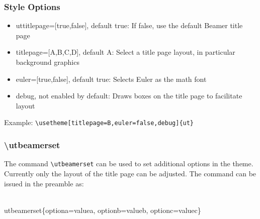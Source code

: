 \documentclass{beamer}
\begin{document}
\begin{frame}[fragile] \frametitle{Style Options}
\begin{itemize}
\item uttitlepage=[true,false], default true: If false, use the default Beamer title page
\item titlepage=[A,B,C,D], default A: Select a title page layout, in particular background graphics
\item euler=[true,false], default true: Selects Euler as the math font
\item debug, not enabled by default: Draws boxes on the title page to facilitate layout
\end{itemize}

Example: \verb!\usetheme[titlepage=B,euler=false,debug]{ut}!
\end{frame}


\begin{frame}[fragile] \frametitle{\textbackslash utbeamerset}
The command \verb!\utbeamerset! can be used to set additional options in the theme. Currently
only the layout of the title page can be adjusted. The command can be issued in the preamble as:
{\tiny
\begin{semiverbatim}
\\utbeamerset\{optiona=valuea, optionb=valueb, optionc=valuec\}
\end{semiverbatim}
}
\end{frame}
\end{document}
